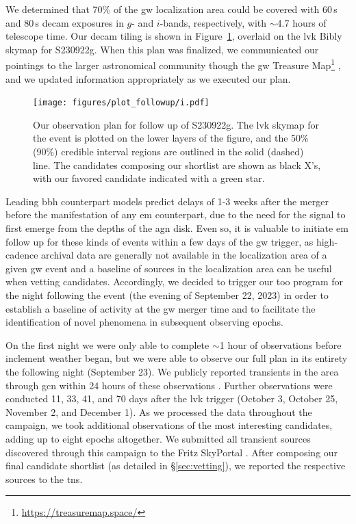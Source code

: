 \documentclass[twocolumn]{aastex631}
\newcommand{\gweventid}{S230922g\xspace}
\begin{document}
We determined that 70\% of the \gls{gw} localization area could be covered with 60\,s and 80\,s \gls{decam} exposures in $g$- and $i$-bands, respectively, with $\sim$4.7 hours of telescope time.
Our \gls{decam} tiling is shown in Figure~\ref{fig:plot_followup}, overlaid on the \gls{lvk} Bibly skymap \citep{ligoscientificcollaborationLIGOVirgoKAGRA2023a} for \gweventid.
When this plan was finalized, we communicated our pointings to the larger astronomical community though the \gls{gw} Treasure Map\footnote{\url{https://treasuremap.space/}} \citep{Wyatt_2020}, and we updated information appropriately as we executed our plan.

\begin{figure}
    \centering
    \texttt{[image: figures/plot\_followup/i.pdf]}
    \caption{
        Our observation plan for follow up of \gweventid.
        The \gls{lvk} skymap for the event is plotted on the lower layers of the figure, and the 50\% (90\%) credible interval regions are outlined in the solid (dashed) line.
        The candidates composing our shortlist are shown as black X's, with our favored candidate indicated with a green star.
    }
    \label{fig:plot_followup}
\end{figure}

Leading \gls{bbh} counterpart models predict delays of 1-3 weeks after the merger before the manifestation of any \gls{em} counterpart, due to the need for the signal to first emerge from the depths of the \gls{agn} disk.
Even so, it is valuable to initiate \gls{em} follow up for these kinds of events within a few days of the \gls{gw} trigger, as high-cadence archival data are generally not available in the localization area of a given \gls{gw} event and a baseline of sources in the localization area can be useful when vetting candidates.
Accordingly, we decided to trigger our \gls{too} program for the night following the event (the evening of September 22, 2023) in order to establish a baseline of activity at the \gls{gw} merger time and to facilitate the identification of novel phenomena in subsequent observing epochs.

On the first night we were only able to complete $\sim$1 hour of observations before inclement weather began, but we were able to observe our full plan in its entirety the following night (September 23).
We publicly reported transients in the area through  \gls{gcn} within 24 hours of these observations \citep{2023GCN.34763....1C}.
Further observations were conducted 11, 33, 41, and 70 days after the \gls{lvk} trigger (October 3, October 25, November 2, and December 1).
As we processed the data throughout the campaign, we took additional observations of the most interesting candidates, adding up to eight epochs altogether.
We submitted all transient sources discovered through this campaign to the Fritz SkyPortal \citep{skyportal2019,coughlinDataSciencePlatform2023}.
After composing our final candidate shortlist (as detailed in \S\ref{sec:vetting}), we reported the respective sources to the \gls{tns}.
\end{document}
